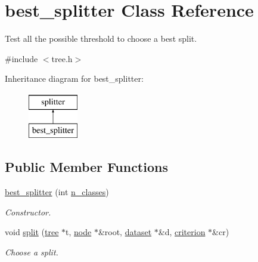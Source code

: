 \hypertarget{classbest__splitter}{\section{best\+\_\+splitter Class Reference}
\label{classbest__splitter}
}


Test all the possible threshold to choose a best split.  




{\ttfamily \#include $<$tree.\+h$>$}

Inheritance diagram for best\+\_\+splitter\+:\begin{figure}[H]
\begin{center}
\leavevmode
\includegraphics[height=2.000000cm]{classbest__splitter}
\end{center}
\end{figure}
\subsection*{Public Member Functions}
\begin{DoxyCompactItemize}
\item 
\hyperlink{classbest__splitter_a40d856f885a1ed21fa840063b8d49164}{best\+\_\+splitter} (int \hyperlink{classsplitter_abfc53538ed65c0afd50aedbf46dff458}{n\+\_\+classes})
\begin{DoxyCompactList}\small\item\em Constructor. \end{DoxyCompactList}\item 
void \hyperlink{classbest__splitter_a1ff1e766bfa4fb6d41c23121d6dd3dbb}{split} (\hyperlink{classtree}{tree} $\ast$t, \hyperlink{classnode}{node} $\ast$\&root, \hyperlink{classdataset}{dataset} $\ast$\&d, \hyperlink{classcriterion}{criterion} $\ast$\&cr)
\begin{DoxyCompactList}\small\item\em Choose a split. \end{DoxyCompactList}\end{DoxyCompactItemize}
